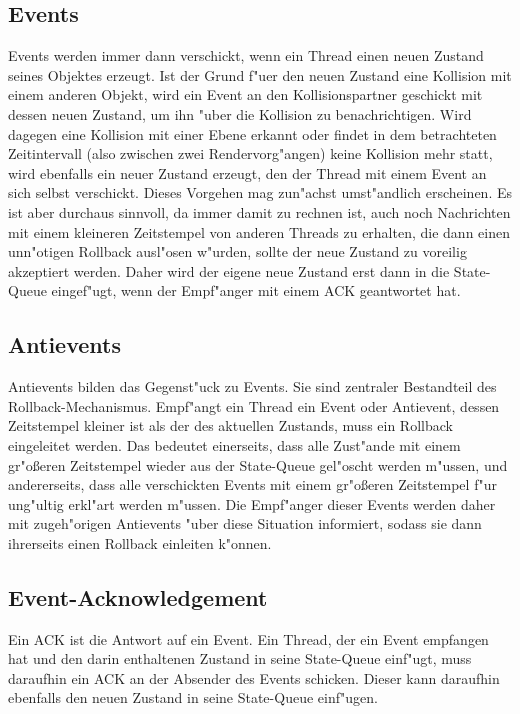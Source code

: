 \documentclass{scrreprt}
\begin{document}
\subsection{Events}
Events werden immer dann verschickt, wenn ein Thread einen neuen Zustand seines Objektes erzeugt. Ist der Grund f"uer den
neuen Zustand eine Kollision mit einem anderen Objekt, wird ein Event an den Kollisionspartner geschickt mit dessen
neuen Zustand, um ihn "uber
die Kollision zu benachrichtigen. Wird dagegen eine Kollision mit einer Ebene erkannt oder findet in dem betrachteten
Zeitintervall (also zwischen zwei Rendervorg"angen) keine Kollision mehr statt, wird ebenfalls ein neuer Zustand
erzeugt, den der Thread mit einem Event an sich selbst verschickt. Dieses Vorgehen mag zun"achst umst"andlich erscheinen. Es ist aber
durchaus sinnvoll, da immer damit zu rechnen ist, auch noch Nachrichten mit einem kleineren Zeitstempel von anderen
Threads zu erhalten, die dann einen unn"otigen Rollback ausl"osen w"urden, sollte der neue Zustand zu voreilig akzeptiert
werden. Daher wird der eigene neue Zustand erst dann in die State-Queue eingef"ugt, wenn der Empf"anger mit einem ACK
geantwortet hat.

\subsection{Antievents}
Antievents bilden das Gegenst"uck zu Events. Sie sind zentraler Bestandteil des Rollback-Mechanismus. Empf"angt ein
Thread ein Event oder Antievent, dessen Zeitstempel kleiner ist als der des aktuellen Zustands, muss ein Rollback eingeleitet
werden. Das bedeutet einerseits, dass alle Zust"ande mit einem gr"o\ss eren Zeitstempel wieder aus der State-Queue gel"oscht werden m"ussen, und
andererseits, dass alle verschickten Events mit einem gr"o\ss eren Zeitstempel f"ur ung"ultig erkl"art werden m"ussen.
Die Empf"anger dieser Events werden daher mit
zugeh"origen Antievents "uber diese Situation informiert, sodass sie dann ihrerseits einen Rollback einleiten k"onnen.

\subsection{Event-Acknowledgement}
Ein ACK ist die Antwort auf ein Event. Ein Thread, der ein Event empfangen hat und den darin enthaltenen Zustand in
seine State-Queue einf"ugt, muss daraufhin ein ACK an der Absender des Events schicken. Dieser kann daraufhin
ebenfalls den neuen Zustand in seine State-Queue einf"ugen.
\end{document}
